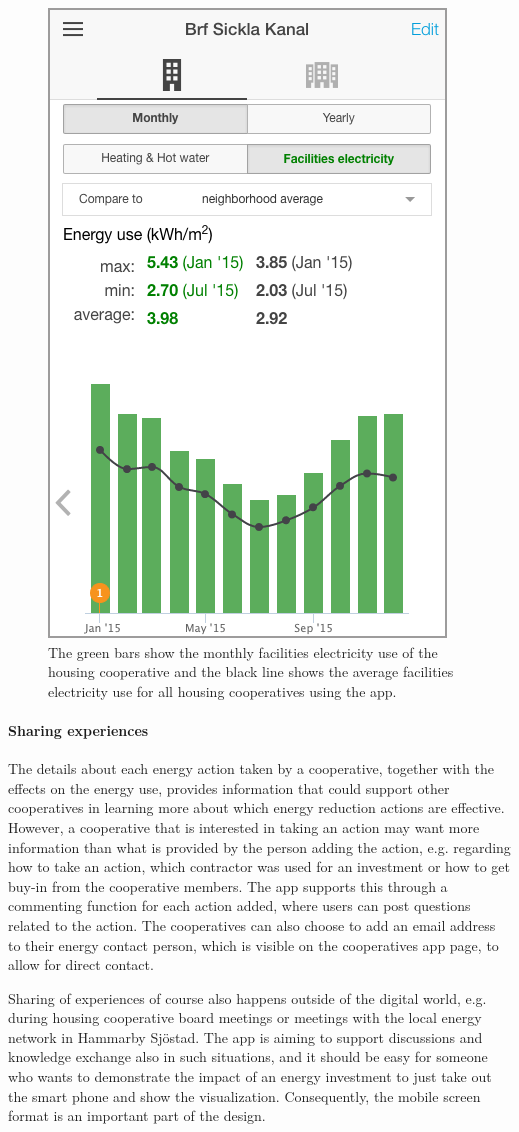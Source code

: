 \begin{figure}
	\centering
	\includegraphics[width=0.4\linewidth]{img/Figure204_Neighbourhood_average.png}
	\caption{The green bars show the monthly facilities electricity use of the housing cooperative and the black line shows the average facilities electricity use for all housing cooperatives using the app.}
	\label{fig:Figure204_Neighbourhood_average}
\end{figure}

\paragraph{Sharing experiences}

The details about each energy action taken by a cooperative, together with the effects on the energy use, provides information that could support other cooperatives in learning more about which energy reduction actions are effective. However, a cooperative that is interested in taking an action may want more information than what is provided by the person adding the action, e.g. regarding how to take an action, which contractor was used for an investment or how to get buy-in from the cooperative members. The app supports this through a commenting function for each action added, where users can post questions related to the action. The cooperatives can also choose to add an email address to their energy contact person, which is visible on the cooperatives app page, to allow for direct contact.

Sharing of experiences of course also happens outside of the digital world, e.g. during housing cooperative board meetings or meetings with the local energy network in Hammarby Sj{\"o}stad. The app is aiming to support discussions and knowledge exchange also in such situations, and it should be easy for someone who wants to demonstrate the impact of an energy investment to just take out the smart phone and show the visualization. Consequently, the mobile screen format is an important part of the design.
